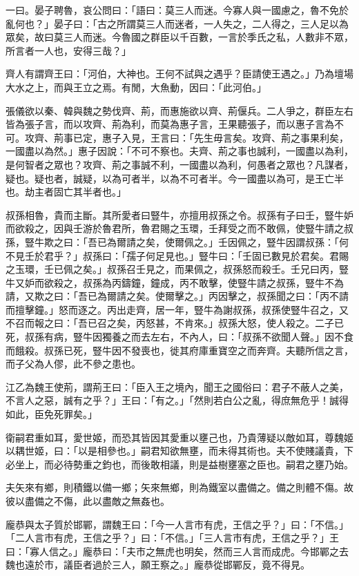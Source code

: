 \begin{pinyinscope}
一曰。晏子聘魯，哀公問曰：「語曰：莫三人而迷。今寡人與一國慮之，魯不免於亂何也？」晏子曰：「古之所謂莫三人而迷者，一人失之，二人得之，三人足以為眾矣，故曰莫三人而迷。今魯國之群臣以千百數，一言於季氏之私，人數非不眾，所言者一人也，安得三哉？」

齊人有謂齊王曰：「河伯，大神也。王何不試與之遇乎？臣請使王遇之。」乃為壇場大水之上，而與王立之焉。有閒，大魚動，因曰：「此河伯。」

張儀欲以秦、韓與魏之勢伐齊、荊，而惠施欲以齊、荊偃兵。二人爭之，群臣左右皆為張子言，而以攻齊、荊為利，而莫為惠子言，王果聽張子，而以惠子言為不可。攻齊、荊事已定，惠子入見，王言曰：「先生毋言矣。攻齊、荊之事果利矣，一國盡以為然。」惠子因說：「不可不察也。夫齊、荊之事也誠利，一國盡以為利，是何智者之眾也？攻齊、荊之事誠不利，一國盡以為利，何愚者之眾也？凡謀者，疑也。疑也者，誠疑，以為可者半，以為不可者半。今一國盡以為可，是王亡半也。劫主者固亡其半者也。」

叔孫相魯，貴而主斷。其所愛者曰豎牛，亦擅用叔孫之令。叔孫有子曰壬，豎牛妒而欲殺之，因與壬游於魯君所，魯君賜之玉環，壬拜受之而不敢佩，使豎牛請之叔孫，豎牛欺之曰：「吾已為爾請之矣，使爾佩之。」壬因佩之，豎牛因謂叔孫：「何不見壬於君乎？」叔孫曰：「孺子何足見也。」豎牛曰：「壬固已數見於君矣。君賜之玉環，壬已佩之矣。」叔孫召壬見之，而果佩之，叔孫怒而殺壬。壬兄曰丙，豎牛又妒而欲殺之，叔孫為丙鑄鐘，鐘成，丙不敢擊，使豎牛請之叔孫，豎牛不為請，又欺之曰：「吾已為爾請之矣。使爾擊之。」丙因擊之，叔孫聞之曰：「丙不請而擅擊鐘。」怒而逐之。丙出走齊，居一年，豎牛為謝叔孫，叔孫使豎牛召之，又不召而報之曰：「吾已召之矣，丙怒甚，不肯來。」叔孫大怒，使人殺之。二子已死，叔孫有病，豎牛因獨養之而去左右，不內人，曰：「叔孫不欲聞人聲。」因不食而餓殺。叔孫已死，豎牛因不發喪也，徙其府庫重寶空之而奔齊。夫聽所信之言，而子父為人僇，此不參之患也。

江乙為魏王使荊，謂荊王曰：「臣入王之境內，聞王之國俗曰：君子不蔽人之美，不言人之惡，誠有之乎？」王曰：「有之。」「然則若白公之亂，得庶無危乎！誠得如此，臣免死罪矣。」

衛嗣君重如耳，愛世姬，而恐其皆因其愛重以壅己也，乃貴薄疑以敵如耳，尊魏姬以耦世姬，曰：「以是相參也。」嗣君知欲無壅，而未得其術也。夫不使賤議貴，下必坐上，而必待勢重之鈞也，而後敢相議，則是益樹壅塞之臣也。嗣君之壅乃始。

夫矢來有鄉，則積鐵以備一鄉；矢來無鄉，則為鐵室以盡備之。備之則體不傷。故彼以盡備之不傷，此以盡敵之無姦也。

龐恭與太子質於邯鄲，謂魏王曰：「今一人言市有虎，王信之乎？」曰：「不信。」「二人言市有虎，王信之乎？」曰：「不信。」「三人言市有虎，王信之乎？」王曰：「寡人信之。」龐恭曰：「夫市之無虎也明矣，然而三人言而成虎。今邯鄲之去魏也遠於市，議臣者過於三人，願王察之。」龐恭從邯鄲反，竟不得見。


\end{pinyinscope}
